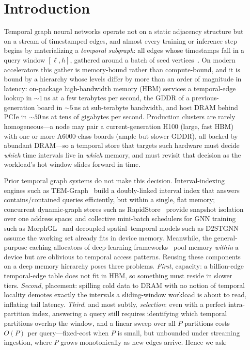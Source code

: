 \documentclass[10pt]{article}
\theoremstyle{definition}
\begin{document}
\section{Introduction}
\label{sec:introduction}

Temporal graph neural networks operate not on a static adjacency structure but on
a stream of timestamped edges, and almost every training or inference step begins
by materializing a \emph{temporal subgraph}: all edges whose timestamps fall in a
query window $[\ell, h]$, gathered around a batch of seed
vertices~\citep{rossi2020tgn,hamilton2017graphsage}. On modern accelerators this
gather is memory-bound rather than compute-bound, and it is bound by a hierarchy
whose levels differ by more than an order of magnitude in latency: on-package
high-bandwidth memory (HBM) services a temporal-edge lookup in ${\sim}1$\,ns at a
few terabytes per second, the GDDR of a previous-generation board in ${\sim}5$\,ns
at sub-terabyte bandwidth, and host DRAM behind PCIe in ${\sim}50$\,ns at tens of
gigabytes per second. Production clusters are rarely homogeneous---a node may pair
a current-generation H100 (large, fast HBM) with one or more A6000-class boards
(ample but slower GDDR), all backed by abundant DRAM---so a temporal store that
targets such hardware must decide \emph{which} time intervals live in \emph{which}
memory, and must revisit that decision as the workload's hot window slides forward
in time.

Prior temporal graph systems do not make this decision. Interval-indexing engines
such as TEM-Graph~\citep{temgraph} build a doubly-linked interval index that
answers contains/contained queries efficiently, but within a single, flat memory;
concurrent dynamic-graph stores such as RapidStore~\citep{rapidstore} provide
snapshot isolation over one address space; and collective mini-batch schedulers
for GNN training such as MorphGL~\citep{morphgl} and decoupled spatial--temporal
models such as D2STGNN~\citep{d2stgnn} assume the working set already fits in
device memory. Meanwhile, the general-purpose caching allocators of deep-learning
frameworks~\citep{paszke2019pytorch,nccl} pool memory \emph{within} a device but
are oblivious to temporal access patterns. Reusing these components on a deep
memory hierarchy poses three problems. \emph{First}, capacity: a billion-edge
temporal-edge table does not fit in HBM, so something must reside in slower tiers.
\emph{Second}, placement: spilling cold data to DRAM with no notion of temporal
locality demotes exactly the intervals a sliding-window workload is about to read,
inflating tail latency. \emph{Third}, and most subtly, \emph{selection}: even with
a perfect intra-partition index, answering a query still requires identifying
which temporal partitions overlap the window, and a linear sweep over all $P$
partitions costs $O(P)$ per query---fixed-cost when $P$ is small, but unbounded
under streaming ingestion, where $P$ grows monotonically as new edges arrive.
Hence we ask:
\end{document}
